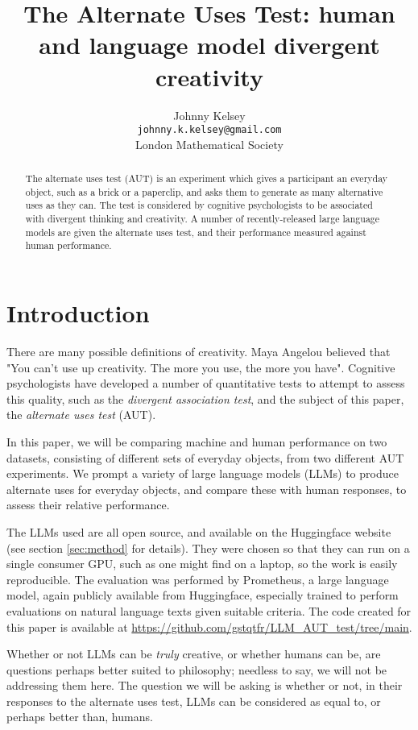 \documentclass{article}
\title{The Alternate Uses Test: human and language model divergent creativity}
\author{
  Johnny Kelsey \\
  \texttt{johnny.k.kelsey@gmail.com} \\
  London Mathematical Society \\
}
\begin{document}
\maketitle


\begin{abstract}
The alternate uses test (AUT) is an experiment which gives a participant an everyday object, such as a brick or a paperclip, and asks them to generate as many alternative uses as they can. The test is considered by cognitive psychologists to be associated with divergent thinking and creativity. A number of recently-released large language models are given the alternate uses test, and their performance measured against human performance. 
\end{abstract}


\section{Introduction}
 There are many possible definitions of creativity. Maya Angelou believed that "You can't use up creativity. The more you use, the more you have". Cognitive psychologists have developed a number of quantitative tests to attempt to assess this quality, such as the \textit{divergent association test}, and the subject of this paper, the \textit{alternate uses test} (AUT). 

In this paper, we will be comparing machine and human performance on two datasets, consisting of different sets of everyday objects, from two different AUT experiments. We prompt a variety of large language models (LLMs) to produce alternate uses for everyday objects, and compare these with human responses, to assess their relative performance. 

The LLMs used are all open source, and available on the Huggingface website (see section \ref{sec:method} for details). They were chosen so that they can run on a single consumer GPU, such as one might find on a laptop, so the work is easily reproducible. The evaluation was performed by Prometheus, a large language model, again publicly available from Huggingface, especially trained to perform evaluations on natural language texts given suitable criteria. The code created for this paper is available at \url{https://github.com/gstqtfr/LLM_AUT_test/tree/main}.   

Whether or not LLMs can be \textit{truly} creative, or whether humans can be, are questions perhaps better suited to philosophy; needless to say, we will not be addressing them here. The question we will be asking is whether or not, in their responses to the alternate uses test, LLMs can be considered as equal to, or perhaps better than, humans. 
\end{document}
